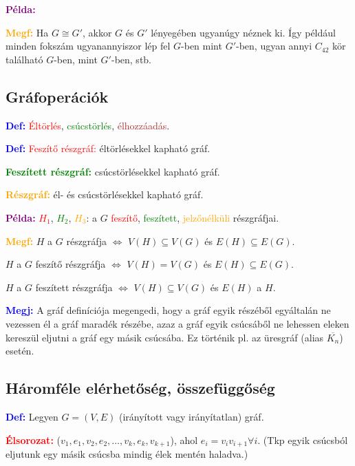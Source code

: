 \documentclass[12pt]{article}
\begin{document}
			\textcolor{purple}{\textbf{Példa:}}

			\textcolor{orange}{\textbf{Megf:}} Ha $G \cong G'$, akkor $G$ és $G'$ lényegében ugyanúgy néznek ki. Így például minden fokszám ugyanannyiszor lép fel $G$-ben mint $G'$-ben, ugyan annyi $C_{42}$ kör található $G$-ben, mint $G'$-ben, stb.

		\subsection{Gráfoperációk}

			\textcolor{blue}{\textbf{Def:}} \textcolor{red}{Éltörlés}, \textcolor{green}{csúcstörlés}, \textcolor{brown}{élhozzáadás}.

			\textcolor{blue}{\textbf{Def:}} \textcolor{red}{Feszítő részgráf:} éltörlésekkel kapható gráf.

			\textcolor{green}{\textbf{Feszített részgráf:}} csúcstörlésekkel kapható gráf.

			\textcolor{orange}{\textbf{Részgráf:}} él- és csúcstörlésekkel kapható gráf.

			\textcolor{purple}{\textbf{Példa:}} \textcolor{red}{$H_1$}, \textcolor{green}{$H_2$}, \textcolor{orange}{$H_3$}: a $G$ \textcolor{red}{feszítő}, \textcolor{green}{feszített}, \textcolor{orange}{jelzőnélküli} részgráfjai.
		
			\textcolor{orange}{\textbf{Megf:}} $H$ a $G$ részgráfja $\Longleftrightarrow$ $V(H) \subseteq V(G)$ és $E(H) \subseteq E(G)$.

			$H$ a $G$ feszítő részgráfja $\Longleftrightarrow$ $V(H) = V(G)$ és $E(H) \subseteq E(G)$.

			$H$ a $G$ feszített részgráfja $\Longleftrightarrow$ $V(H) \subseteq V(G)$ és $E(H)$ a $H$.

			\textcolor{blue}{\textbf{Megj:}} A gráf definíciója megengedi, hogy a gráf egyik részéből egyáltalán ne vezessen él a gráf maradék részébe, azaz a gráf egyik csúcsáből ne lehessen eleken kereszül eljutni a gráf egy másik csúcsába. Ez történik pl. az üresgráf (alias $\overline{K_n}$) esetén.

		\subsection{Háromféle elérhetőség, összefüggőség}

			\textcolor{blue}{\textbf{Def:}} Legyen $G = (V,E)$ (irányított vagy irányítatlan) gráf.

			\textcolor{red}{\textbf{Élsorozat:}} ($v_1,e_1,v_2,e_2,\dots,v_k,e_k,v_{k+1}$), ahol $e_i=v_i v_{i+1}\forall i$. (Tkp egyik csúcsból eljutunk egy másik csúcsba mindig élek mentén haladva.)
\end{document}
